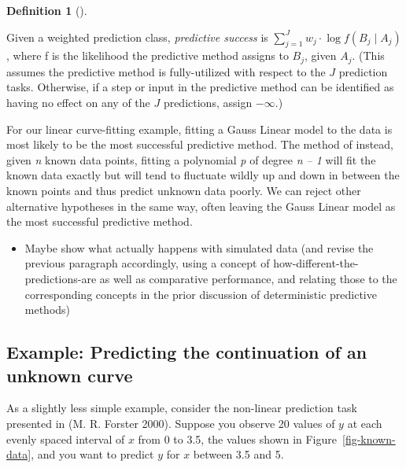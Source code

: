 \documentclass[
  letterpaper,
  DIV=11,
  numbers=noendperiod]{scrartcl}
\providecommand{\tightlist}{%
  \setlength{\itemsep}{0pt}\setlength{\parskip}{0pt}}
\theoremstyle{definition}
\newtheorem{definition}{Definition}[section]
\theoremstyle{remark}
\begin{document}
\begin{definition}[]\protect\hypertarget{def-success}{}\label{def-success}

Given a weighted prediction class, \emph{predictive success} is
\(\sum_{j=1}^{J} w_j \cdot \log f(B_j \mid A_j)\), where f is the
likelihood the predictive method assigns to \(B_j\), given \(A_j\).
(This assumes the predictive method is fully-utilized with respect to
the \(J\) prediction tasks. Otherwise, if a step or input in the
predictive method can be identified as having no effect on any of the
\(J\) predictions, assign \(-\infty\).)

\end{definition}

For our linear curve-fitting example, fitting a Gauss Linear model to
the data is most likely to be the most successful predictive method. The
method of instead, given \emph{n} known data points, fitting a
polynomial \emph{p} of degree \emph{n -- 1} will fit the known data
exactly but will tend to fluctuate wildly up and down in between the
known points and thus predict unknown data poorly. We can reject other
alternative hypotheses in the same way, often leaving the Gauss Linear
model as the most successful predictive method.

\begin{itemize}
\tightlist
\item
  Maybe show what actually happens with simulated data (and revise the
  previous paragraph accordingly, using a concept of
  how-different-the-predictions-are as well as comparative performance,
  and relating those to the corresponding concepts in the prior
  discussion of deterministic predictive methods)
\end{itemize}

\subsection{Example: Predicting the continuation of an unknown
curve}\label{example-predicting-the-continuation-of-an-unknown-curve}

As a slightly less simple example, consider the non-linear prediction
task presented in (M. R. Forster 2000). Suppose you observe 20 values of
\(y\) at each evenly spaced interval of \(x\) from 0 to 3.5, the values
shown in Figure~\ref{fig-known-data}, and you want to predict \(y\) for
\(x\) between 3.5 and 5.
\end{document}
